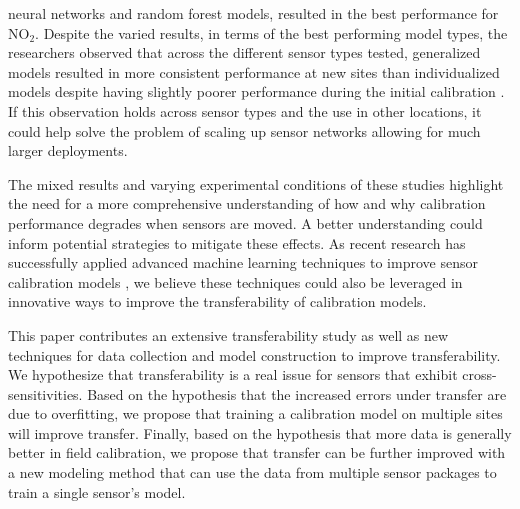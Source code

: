 \documentclass[journal abbreviation, manuscript]{copernicus}
\newcommand{\textus}[1]{$_{\text{#1}}$}
\begin{document}
neural networks and random forest models, resulted in the best performance for NO\textus{2}.  Despite the varied results, in terms of the best performing model types, the researchers observed that across the different sensor types tested, generalized models resulted in more consistent performance at new sites than individualized models despite having slightly poorer performance during the initial calibration \citep{Malings2018Development}.  If this observation holds across sensor types and the use in other locations, it could help solve the problem of scaling up sensor networks allowing for much larger deployments. 

The mixed results and varying experimental conditions of these studies highlight the need for a more comprehensive understanding of how and why calibration performance degrades when sensors are moved. A better understanding could inform potential strategies to mitigate these effects.  As recent research has successfully applied advanced machine learning techniques to improve sensor calibration models \citep{Zimmerman2018, DeVito2009, Casey2018Performance}, we believe these techniques could also be leveraged in innovative ways to improve the transferability of calibration models.

This paper contributes an extensive transferability study as well as new techniques for data collection and model construction to improve transferability.  We hypothesize that transferability is a real issue for sensors that exhibit cross-sensitivities.   Based on the hypothesis that the increased errors under transfer are due to overfitting, we propose that training a calibration model on multiple sites will improve transfer.  Finally, based on the hypothesis that more data is generally better in field calibration, we propose that transfer can be further improved with a new modeling method that can use the data from multiple sensor packages to train a single sensor's model.

\end{document}
